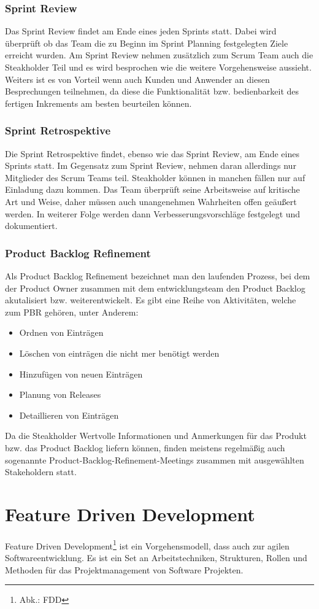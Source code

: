 \documentclass[a4paper, twopage]{scrreprt}
\begin{document}
\subsection{Sprint Review}
Das Sprint Review findet am Ende eines jeden Sprints statt. Dabei wird überprüft ob das Team die zu Beginn im Sprint Planning festgelegten Ziele erreicht wurden. Am Sprint Review nehmen zusätzlich zum Scrum Team auch die Steakholder Teil und es wird besprochen wie die weitere Vorgehensweise aussieht. Weiters ist es von Vorteil wenn auch Kunden und Anwender an diesen Besprechungen teilnehmen, da diese die Funktionalität bzw. bedienbarkeit des fertigen Inkrements am besten beurteilen können.
\subsection{Sprint Retrospektive}
Die Sprint Retrospektive findet, ebenso wie das Sprint Review, am Ende eines Sprints statt. Im Gegensatz zum Sprint Review, nehmen daran allerdings nur Mitglieder des Scrum Teams teil. Steakholder können in manchen fällen nur auf Einladung dazu kommen. Das Team überprüft seine Arbeitsweise auf kritische Art und Weise, daher müssen auch unangenehmen Wahrheiten offen geäußert werden. In weiterer Folge werden dann Verbesserungsvorschläge festgelegt und dokumentiert.
\subsection{Product Backlog Refinement}
Als Product Backlog Refinement bezeichnet man den laufenden Prozess, bei dem der Product Owner zusammen mit dem entwicklungsteam den Product Backlog akutalisiert bzw. weiterentwickelt.
Es gibt eine Reihe von Aktivitäten, welche zum PBR gehören, unter Anderem:
\begin{itemize}
	\item Ordnen von Einträgen
	\item Löschen von einträgen die nicht mer benötigt werden
	\item Hinzufügen von neuen Einträgen
	\item Planung von Releases
	\item Detaillieren von Einträgen
\end{itemize}
Da die Steakholder Wertvolle Informationen und Anmerkungen für das Produkt bzw. das Product Backlog liefern können, finden meistens regelmäßig auch sogenannte Product-Backlog-Refinement-Meetings zusammen mit ausgewählten Stakeholdern statt.

\chapter{Feature Driven Development}
Feature Driven Development\footnote{Abk.: FDD} ist ein Vorgehensmodell, dass auch zur agilen Softwareentwicklung. Es ist ein Set an Arbeitstechniken, Strukturen, Rollen und Methoden für das Projektmanagement von Software Projekten.
\end{document}

